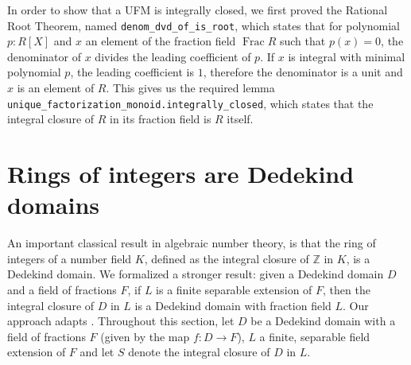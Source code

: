 \documentclass[a4paper,USenglish,cleveref, autoref, thm-restate]{lipics-v2021}
\newcommand{\lean}[1]{\texttt{#1}\xspace} %
\newcommand{\Z}{\mathbb{Z}}
\DeclareMathOperator{\Frac}{Frac}
\begin{document}
In order to show that a UFM is integrally closed, we first proved the Rational Root Theorem, named \lean{denom\_dvd\_of\_is\_root},
which states that for polynomial $p : R[X]$ and $x$ an element of the fraction field $\Frac R$ such that $p(x) = 0$, the denominator of $x$ divides the leading coefficient of $p$.
If $x$ is integral with minimal polynomial $p$, the leading coefficient is $1$, therefore the denominator is a unit and $x$ is an element of $R$.
This gives us the required lemma \lean{unique\_factorization\_monoid.integrally\_closed}, which states that the integral closure of $R$ in its fraction field is $R$ itself.

\section{Rings of integers are Dedekind domains} \label{sec:integral-closure}


An important classical result in algebraic number theory, is that the ring of integers of a number field $K$, defined as the integral closure of $\Z$ in $K$, is a Dedekind domain. We formalized a stronger result: given a Dedekind domain $D$ and a field of fractions $F$, if $L$ is a finite separable extension of $F$, then the integral closure of $D$ in $L$ is a Dedekind domain with fraction field $L$.
Our approach adapts \cite[Theorem~3.1]{Neukirch}.
Throughout this section, let $D$ be a Dedekind domain with a field of fractions $F$ (given by the map $f \colon D \to F$), $L$ a finite, separable field extension of $F$ and let $S$ denote the integral closure of $D$ in $L$.
\end{document}
